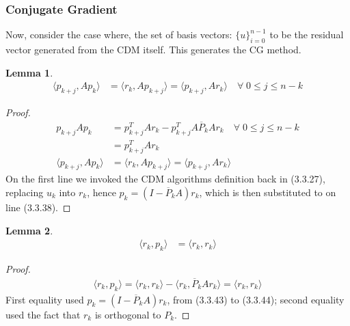 \documentclass[]{article}
\theoremstyle{definition}
\newtheorem{lemma}{Lemma}[subsection]    %
\begin{document}
        \subsubsection{Conjugate Gradient}
            Now, consider the case where, the set of basis vectors: $\{u\}_{i = 0}^{n - 1}$ to be the residual vector generated from the CDM itself. This generates the CG method.
            \begin{lemma}\label{lemma:CG_Lemma_1}
                \begin{align}
                    \langle p_{k + j}, Ap_k\rangle
                    &=\langle r_k, Ap_{k + j}\rangle
                    = \langle p_{k + j}, Ar_k\rangle \quad \forall\; 0 \le j \le n - k
                \end{align}
            \end{lemma}
            \begin{proof}
                \begin{align}
                    p_{k + j} Ap_k &= p_{k + j}^TAr_k - p_{k + j}^TA\overline{P}_{k}Ar_k \quad 
                    \forall\; 0 \le j \le n - k
                    \\
                    &= p_{k + j}^TAr_k
                    \\
                    \langle p_{k + j}, Ap_k\rangle
                    &= \langle r_k, Ap_{k + j}\rangle
                    = \langle p_{k + j}, Ar_k\rangle
                \end{align}
                On the first line we invoked the CDM algorithms definition back in (3.3.27), replacing $u_k$ into $r_k$, hence $p_k = (I - \overline{P}_kA)r_k$, which is then substituted to on line (3.3.38). 
            \end{proof}
            \begin{lemma}\label{lemma:CG_Lemma_2}
                \begin{align}
                    \langle r_k, p_k\rangle &= \langle r_k, r_k\rangle
                \end{align}
            \end{lemma}
            \begin{proof}
                \begin{align}
                    \langle r_k, p_k\rangle = \langle r_k, r_k\rangle - \langle r_k, \overline{P}_kAr_k\rangle = \langle r_k, r_k\rangle
                \end{align}
                First equality used $p_k = (I - \overline{P}_kA)r_k$, from (3.3.43) to (3.3.44); second equality used the fact that $r_k$ is orthogonal to $P_k$. 
            \end{proof}
\end{document}
